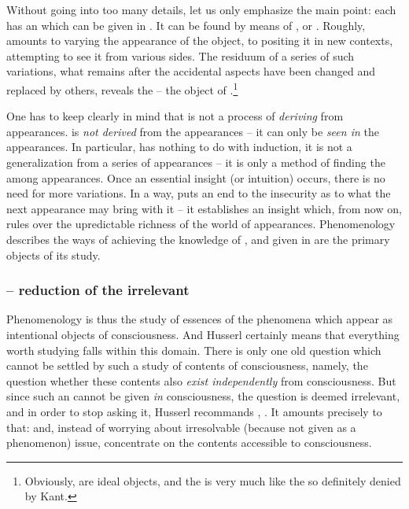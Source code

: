 Without going 
into too many details, let us only emphasize the main point: each 
 has an  which can be given in
. It can be found by means 
of , or .  Roughly,  amounts to 
varying the appearance of the object, to positing it in new contexts, 
attempting to see it from various sides. The residuum of a series of 
such variations, what remains after the accidental aspects have been 
changed and replaced by others, reveals the  -- the object of 
.\footnote{Obviously,  are 
ideal objects, and the  is very much like the  so 
definitely denied by Kant.} 

One has to keep clearly in mind that  is not a process of 
{\em deriving}  from appearances.
 is {\em not derived} from the
appearances -- it can only be {\em seen in} the appearances. In 
particular,  has nothing to do with induction, it is not 
a generalization from a series of appearances -- it is only a method 
of finding the  among appearances.
Once an essential insight (or intuition) occurs, there is 
no need for more variations. In a way,  puts an 
end to the insecurity as to what the next appearance may bring with 
it -- it establishes an insight which, from now on, rules over the
upredictable richness of the world of appearances.
Phenomenology describes the ways of 
achieving the knowledge of , and  given in 
 are the primary objects of its 
study.

\subsubsection{ -- reduction of the irrelevant}

Phenomenology is thus the study of essences of the phenomena which 
appear as intentional objects of consciousness.  And Husserl 
certainly means that everything worth studying falls within this 
domain. There is only one old question which cannot be settled by 
such a study of contents of consciousness, namely, the question 
whether these contents also {\em exist independently} from 
consciousness. But since such an  cannot be 
given {\em in} consciousness, the question is deemed irrelevant, and in 
order to stop asking it, Husserl recommands , .
It amounts precisely to that:  and, instead of worrying about irresolvable (because not 
given as a phenomenon) issue, 
concentrate on the contents accessible to consciousness.

